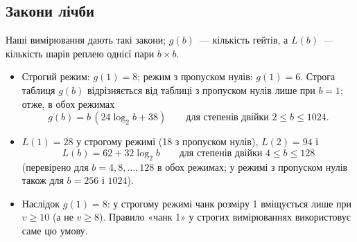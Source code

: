 \documentclass[11pt]{article}
\theoremstyle{plain}
\begin{document}
\subsection{Закони лічби}\label{sec:counting}
Наші вимірювання дають такі закони; $g(b)$~--- кількість гейтів, а $L(b)$~--- кількість шарів реплею однієї пари $b\times b$.
\begin{itemize}
\item Строгий режим: $g(1)=8$; режим з пропуском нулів: $g(1)=6$. Строга таблиця $g(b)$ відрізняється від таблиці з пропуском нулів лише при $b=1$; отже, в обох режимах
\begin{equation}\label{eq:gb}
g(b)=b\,(24\log_2 b+38)\qquad\text{для степенів двійки } 2\le b\le1024.
\end{equation}
\item $L(1)=28$ у строгому режимі (18 з пропуском нулів), $L(2)=94$ і
\begin{equation}\label{eq:Lb}
L(b)=62+32\log_2 b\qquad\text{для степенів двійки } 4\le b\le128
\end{equation}
(перевірено для $b=4,8,\dots,128$ в обох режимах; у режимі з пропуском нулів також для $b=256$ і $1024$).
\item Наслідок $g(1)=8$: у строгому режимі чанк розміру 1 вміщується лише при $v\ge10$ (а не $v\ge8$). Правило «чанк 1» у строгих вимірюваннях використовує саме цю умову.
\end{itemize}
\end{document}
